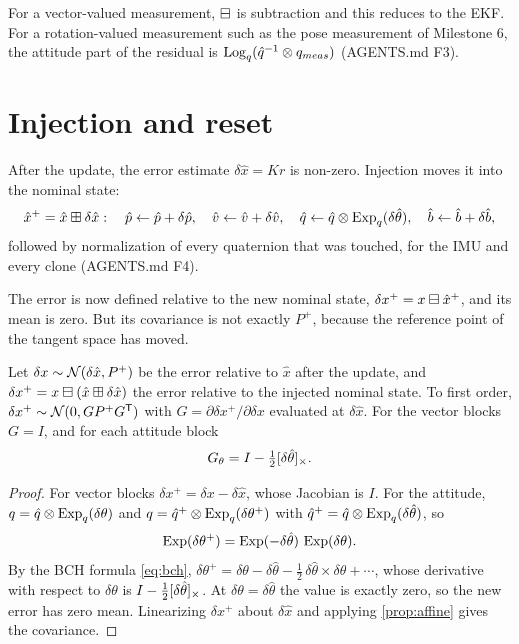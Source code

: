 For a vector-valued measurement, $\boxminus$ is subtraction and this reduces to the EKF. For a rotation-valued measurement such as the pose
measurement of Milestone 6, the attitude part of the residual is $\operatorname{Log}_q(\hat q^{-1}\otimes q_{meas})$ (AGENTS.md F3).

\section{Injection and reset}
\label{sec:reset}

After the update, the error estimate $\delta\hat x = Kr$ is non-zero. Injection moves it into the nominal state:
\begin{equation}
  \hat x^+ = \hat x\boxplus\delta\hat x:\quad
  \hat p \gets \hat p + \delta\hat p,\quad \hat v \gets \hat v + \delta\hat v,\quad
  \hat q \gets \hat q\otimes\operatorname{Exp}_q(\delta\hat\theta),\quad \hat b \gets \hat b + \delta\hat b,
\end{equation}
followed by normalization of every quaternion that was touched, for the IMU and every clone (AGENTS.md F4).

The error is now defined relative to the new nominal state, $\delta x^+ = x\boxminus\hat x^+$, and its mean is zero. But its covariance is not exactly $P^+$,
because the reference point of the tangent space has moved.

\begin{proposition}
\label{prop:reset}
Let $\delta x \sim \mathcal{N}(\delta\hat x, P^+)$ be the error relative to $\hat x$ after the update, and $\delta x^+ = x\boxminus(\hat x\boxplus\delta\hat x)$ the error relative to the
injected nominal state. To first order, $\delta x^+ \sim \mathcal{N}(0, GP^+G^{\mathsf{T}})$ with $G = \partial\delta x^+/\partial\delta x$ evaluated at $\delta\hat x$. For the vector blocks
$G = I$, and for each attitude block
\begin{equation}
  G_\theta = I - \tfrac12[\delta\hat\theta]_{\times}.
  \label{eq:reset-G}
\end{equation}
\end{proposition}
\begin{proof}
For vector blocks $\delta x^+ = \delta x - \delta\hat x$, whose Jacobian is $I$. For the attitude, $q = \hat q\otimes\operatorname{Exp}_q(\delta\theta)$ and
$q = \hat q^+\otimes\operatorname{Exp}_q(\delta\theta^+)$ with $\hat q^+ = \hat q\otimes\operatorname{Exp}_q(\delta\hat\theta)$, so
\begin{equation*}
  \operatorname{Exp}(\delta\theta^+) = \operatorname{Exp}(-\delta\hat\theta)\,\operatorname{Exp}(\delta\theta).
\end{equation*}
By the BCH formula \eqref{eq:bch}, $\delta\theta^+ = \delta\theta - \delta\hat\theta - \tfrac12\,\delta\hat\theta\times\delta\theta + \cdots$, whose derivative with respect to $\delta\theta$ is
$I - \tfrac12[\delta\hat\theta]_{\times}$. At $\delta\theta = \delta\hat\theta$ the value is exactly zero, so the new error has zero mean. Linearizing $\delta x^+$ about $\delta\hat x$ and applying
\cref{prop:affine} gives the covariance.
\end{proof}

